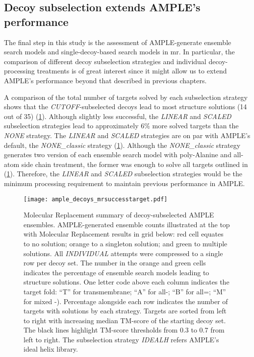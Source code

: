 \subsection{Decoy subselection extends AMPLE's performance}
The final step in this study is the assessment of AMPLE-generate ensemble search models and single-decoy-based search models in \gls{mr}. In particular, the comparison of different decoy subselection strategies and individual decoy-processing treatments is of great interest since it might allow us to extend AMPLE's performance beyond that described in previous chapters.

A comparison of the total number of targets solved by each subselection strategy shows that the \textit{CUTOFF}-subselected decoys lead to most structure solutions (14 out of 35) (\cref{fig:ample_decoys_mrsuccesstarget}). Although slightly less successful, the \textit{LINEAR} and \textit{SCALED} subselection strategies lead to approximately 6\% more solved targets than the \textit{NONE} strategy. The \textit{LINEAR} and \textit{SCALED} strategies are on par with AMPLE's default, the \textit{NONE\_classic} strategy (\cref{fig:ample_decoys_mrsuccesstarget}). Although the \textit{NONE\_classic} strategy generates two version of each ensemble search model with poly-Alanine and all-atom side chain treatment, the former was enough to solve all targets outlined in (\cref{fig:ample_decoys_mrsuccesstarget}). Therefore, the \textit{LINEAR} and \textit{SCALED} subselection strategies would be the minimum processing requirement to maintain previous performance in AMPLE.

\begin{figure}[H]
    \centering
    \texttt{[image: ample\_decoys\_mrsuccesstarget.pdf]}
\caption[Molecular Replacement summary of decoy-subselected AMPLE ensembles]{Molecular Replacement summary of decoy-subselected AMPLE ensembles. AMPLE-generated ensemble counts illustrated at the top with Molecular Replacement results in grid below: red cell equates to no solution; orange to a singleton solution; and green to multiple solutions. All \textit{INDIVIDUAL} attempts were compressed to a single row per decoy set. The number in the orange and green cells indicates the percentage of ensemble search models leading to structure solutions. One letter code above each column indicates the target fold: ``T'' for transmembrane; ``A'' for all-\textalpha; ``B'' for all=\textbeta; ``M'' for mixed \textalpha-\textbeta). Percentage alongside each row indicates the number of targets with solutions by each strategy. Targets are sorted from left to right with increasing median TM-score of the starting decoy set. The black lines highlight TM-score thresholds from 0.3 to 0.7 from left to right. The subselection strategy \textit{IDEALH} refers AMPLE's ideal helix library.}
    \label{fig:ample_decoys_mrsuccesstarget}
\end{figure}

